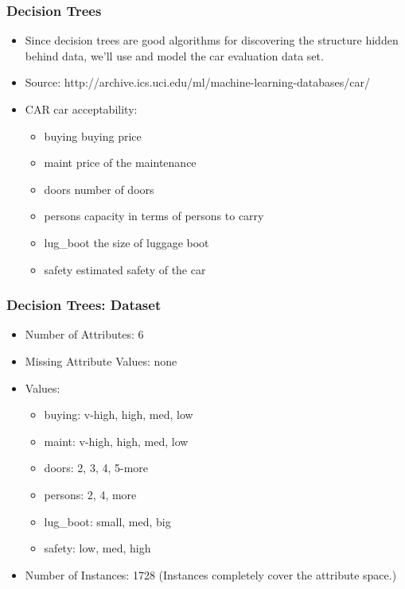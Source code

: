 \begin{frame}[fragile]\frametitle{Decision Trees}
\begin{itemize}
\item Since decision trees are good algorithms for discovering the structure hidden behind data, we'll use and model the car evaluation data set.
\item Source: http://archive.ics.uci.edu/ml/machine-learning-databases/car/
\item CAR car acceptability:
		\begin{itemize}
		\item  buying buying price
		\item  maint price of the maintenance
		\item  doors number of doors
		\item    persons capacity in terms of persons to carry
		\item   lug\_boot the size of luggage boot
		\item  safety estimated safety of the car
		\end{itemize}
\end{itemize}
\end{frame}

\begin{frame}[fragile]\frametitle{Decision Trees: Dataset}
\begin{itemize}
\item Number of Attributes: 6
\item Missing Attribute Values: none
\item Values:
		\begin{itemize}
		\item  buying: 	v-high, high, med, low
		\item  maint: 	v-high, high, med, low
		\item  doors: 	2, 3, 4, 5-more
		\item  persons: 	2, 4, more
		\item  lug\_boot: 	small, med, big
		\item  safety:	low, med, high
		\end{itemize}
\item Number of Instances: 1728 (Instances completely cover the attribute space.)
\end{itemize}
\end{frame}

